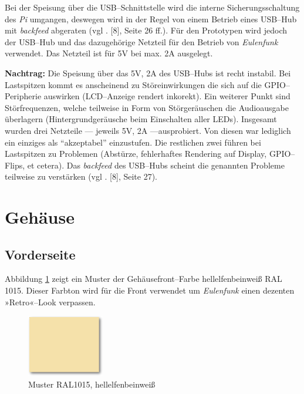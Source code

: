 \documentclass[11pt,ngerman,toc=listof,index=totoc]{scrreprt}
\begin{document}
Bei der Speisung über die USB--Schnittstelle wird die interne
Sicherungsschaltung des \emph{Pi} umgangen, deswegen wird in der Regel
von einem Betrieb eines USB--Hub mit \emph{backfeed} abgeraten (vgl .
{[}8{]}, Seite 26 ff.). Für den Prototypen wird jedoch der USB--Hub und
das dazugehörige Netzteil für den Betrieb von \emph{Eulenfunk}
verwendet. Das Netzteil ist für 5V bei max. 2A ausgelegt.

\textbf{Nachtrag:} Die Speisung über das 5V, 2A des USB--Hubs ist recht
instabil. Bei Lastspitzen kommt es anscheinend zu Störeinwirkungen die
sich auf die GPIO--Peripherie auswirken (LCD--Anzeige rendert inkorekt).
Ein weiterer Punkt sind Störfrequenzen, welche teilweise in Form von
Störgeräuschen die Audioausgabe überlagern (Hintergrundgeräusche beim
Einschalten aller LEDs). Insgesamt wurden drei Netzteile --- jeweils 5V,
2A ---ausprobiert. Von diesen war lediglich ein einziges als
\enquote{akzeptabel} einzustufen. Die restlichen zwei führen bei
Lastspitzen zu Problemen (Abstürze, fehlerhaftes Rendering auf Display,
GPIO--Flips, et cetera). Das \emph{backfeed} des USB--Hubs scheint die
genannten Probleme teilweise zu verstärken (vgl . {[}8{]}, Seite 27).

\section{Gehäuse}\label{gehuxe4use}

\subsection{Vorderseite}\label{vorderseite}

Abbildung \ref{ral} zeigt ein Muster der Gehäusefront--Farbe
hellelfenbeinweiß RAL 1015. Dieser Farbton wird für die Front verwendet
um \emph{Eulenfunk} einen dezenten »Retro«--Look verpassen.

\begin{figure}[h!]
  \centering
  \includegraphics[width=0.3\textwidth]{images/ral_soft.png}
  \caption{Muster RAL1015, hellelfenbeinweiß}
  \label{ral}
\end{figure}
\end{document}

